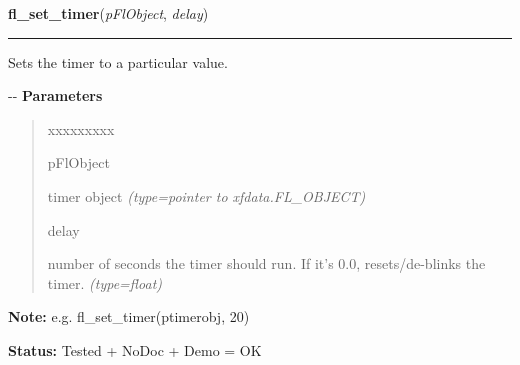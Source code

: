     \label{xformslib:fltimer:fl_set_timer}

    \vspace{0.5ex}

\hspace{.8\funcindent}\begin{boxedminipage}{\funcwidth}

    \raggedright \textbf{fl\_set\_timer}(\textit{pFlObject}, \textit{delay})

    \vspace{-1.5ex}

    \rule{\textwidth}{0.5\fboxrule}
\setlength{\parskip}{2ex}

Sets the timer to a particular value.

-{}-
\setlength{\parskip}{1ex}
      \textbf{Parameters}
      \vspace{-1ex}

      \begin{quote}
        \begin{Ventry}{xxxxxxxxx}

          \item[pFlObject]


timer object
            {\it (type=pointer to xfdata.FL\_OBJECT)}

          \item[delay]


number of seconds the timer should run. If it's 0.0, resets/de-blinks
the timer.
            {\it (type=float)}

        \end{Ventry}

      \end{quote}

\textbf{Note:} 
e.g. fl\_set\_timer(ptimerobj, 20)


\textbf{Status:} 
Tested + NoDoc + Demo = OK


    \end{boxedminipage}

    \label{xformslib:fltimer:fl_get_timer}

    \vspace{0.5ex}

